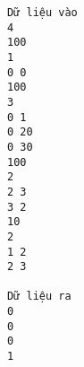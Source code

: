 \begin{verbatim}
Dữ liệu vào
4
100
1
0 0 
100
3
0 1
0 20
0 30 
100
2
2 3
3 2
10
2
1 2 
2 3	

Dữ liệu ra
0
0
0
1
\end{verbatim}